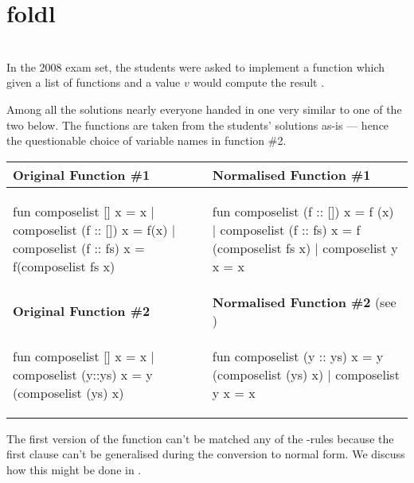 \section{\textsf{foldl}}
\begin{example}\
  \label{ex:fold-instance-composelist}\\
  In the 2008 exam set, the students were asked to implement a 
  function which given a list of functions \ttt{[$f_1$, $f_2$, $\ldots$, $f_n$]}
  and a value $v$ would compute the result .

  Among all the solutions nearly everyone handed in one very similar to one of
  the two below. The functions are taken from the students' solutions as-is ---
  hence the questionable choice of variable names in function \#2.
  \begin{center}
    \begin{tabular}{|l|l|}
      \hline
      \textbf{Original Function \#1}
      & 
      \textbf{Normalised Function \#1}
      \\\hline
\begin{sml}
fun composelist [] x = x
  | composelist (f :: []) x = f(x)
  | composelist (f :: fs) x =
      f(composelist fs x)
\end{sml}
      &
\begin{sml}
fun composelist (f :: []) x = f (x)
  | composelist (f :: fs) x =
      f (composelist fs x)
  | composelist y x = x
\end{sml}
      \\\hline
      \textbf{Original Function \#2}
      &
      \textbf{Normalised Function \#2}
      \footnotesize{(see \fref{tr:trace-normalise-composelist})}
      \\\hline
\begin{sml}
fun composelist [] x = x
  | composelist (y::ys) x =
     y (composelist (ys) x)
\end{sml}
      &
\begin{sml}
fun composelist (y :: ys) x =
      y (composelist (ys) x)
  | composelist y x = x
\end{sml}
      \\\hline
    \end{tabular}
  \end{center}
  The first version of the  function can't be matched any of
  the -rules because the first clause can't be generalised during the
  conversion to normal form. We discuss how this might be done in
  \fref{sec:furth-gener}.


\end{example}
